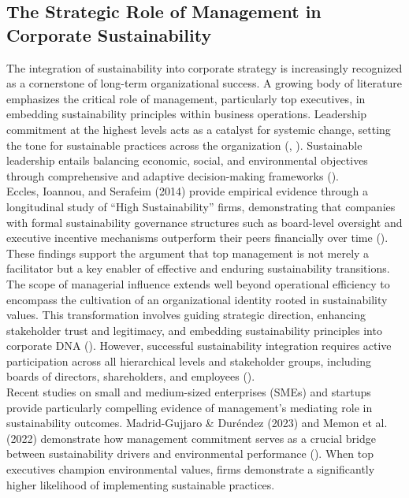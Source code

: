 	\subsection{The Strategic Role of Management in Corporate Sustainability}
	The integration of sustainability into corporate strategy is increasingly recognized as a cornerstone of long-term organizational success. A growing body of literature emphasizes the critical role of management, particularly top executives, in embedding sustainability principles within business operations. Leadership commitment at the highest levels acts as a catalyst for systemic change, setting the tone for sustainable practices across the organization (\textcite{Avery2005}, \textcite{Waldman2008}). Sustainable leadership entails balancing economic, social, and environmental objectives through comprehensive and adaptive decision-making frameworks (\textcite{Lozano2015}). \\
	
	Eccles, Ioannou, and Serafeim (2014) provide empirical evidence through a longitudinal study of “High Sustainability” firms, demonstrating that companies with formal sustainability governance structures such as board-level oversight and executive incentive mechanisms outperform their peers financially over time (\textcite{Eccles2014}). These findings support the argument that top management is not merely a facilitator but a key enabler of effective and enduring sustainability transitions. \\
	
	The scope of managerial influence extends well beyond operational efficiency to encompass the cultivation of an organizational identity rooted in sustainability values. This transformation involves guiding strategic direction, enhancing stakeholder trust and legitimacy, and embedding sustainability principles into corporate DNA (\textcite{Eccles2014, Dyllick2016}). However, successful sustainability integration requires active participation across all hierarchical levels and stakeholder groups, including boards of directors, shareholders, and employees (\textcite{Freeman1984}). \\
	
	Recent studies on small and medium-sized enterprises (SMEs) and startups provide particularly compelling evidence of management’s mediating role in sustainability outcomes. Madrid-Gujjaro \& Duréndez (2023) and Memon et al. (2022) demonstrate how management commitment serves as a crucial bridge between sustainability drivers and environmental performance (\textcite{Madrid2023, Memon2022}). When top executives champion environmental values, firms demonstrate a significantly higher likelihood of implementing sustainable practices. \\
	

